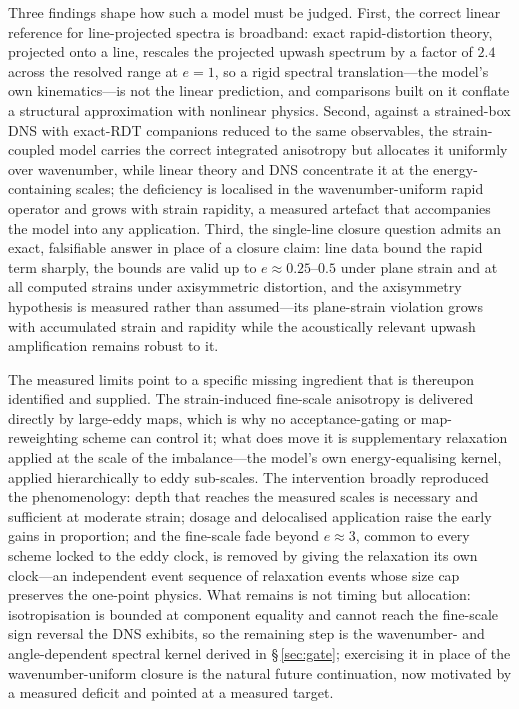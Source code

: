 \documentclass[lineno]{JFM-FLM_Au}
\begin{document}
Three findings shape how such a model must be judged. First, the
correct linear reference for line-projected spectra is broadband: exact
rapid-distortion theory, projected onto a line, rescales the
projected upwash spectrum by a factor of $2.4$ across the resolved range
at $e=1$, so a rigid spectral translation---the model's own
kinematics---is not the linear prediction, and comparisons built on it
conflate a structural approximation with nonlinear physics. Second,
against a strained-box DNS with exact-RDT companions reduced to the
same observables, the strain-coupled model carries the correct
integrated anisotropy but allocates it uniformly over wavenumber, while
linear theory and DNS concentrate it at the energy-containing scales;
the deficiency is localised in the wavenumber-uniform rapid operator
and grows with strain rapidity, a measured artefact that
accompanies the model into any application. Third, the single-line
closure question admits an exact, falsifiable answer in place of a
closure claim: line data bound the rapid term sharply, the bounds are
valid up to $e\approx0.25$--$0.5$ under plane strain and at all
computed strains under axisymmetric distortion, and the axisymmetry
hypothesis is measured rather than assumed---its plane-strain violation
grows with accumulated strain and rapidity while the acoustically
relevant upwash amplification remains robust to it.

The measured limits point to a specific missing ingredient that is thereupon identified and supplied. The strain-induced fine-scale
anisotropy is delivered directly by large-eddy maps, which is why no
acceptance-gating or map-reweighting scheme can control it; what does
move it is supplementary relaxation applied at the scale of the imbalance---the
model's own energy-equalising kernel, applied hierarchically to eddy
sub-scales. The intervention broadly reproduced the phenomenology: depth that reaches the measured scales is necessary and
sufficient at moderate strain; dosage and delocalised application
raise the early gains in proportion; and the fine-scale fade beyond
$e\approx3$, common to every scheme locked to the eddy clock, is
removed by giving the relaxation its own clock---an independent event sequence
of relaxation events whose size cap preserves the one-point
physics. What remains is not timing but allocation: isotropisation is
bounded at component equality and cannot reach the fine-scale sign
reversal the DNS exhibits, so the remaining step is the
wavenumber- and angle-dependent spectral kernel derived in
\S\,\ref{sec:gate}; exercising it in place of the wavenumber-uniform
closure is the natural future continuation, now motivated by a measured
deficit and pointed at a measured target.
\end{document}
